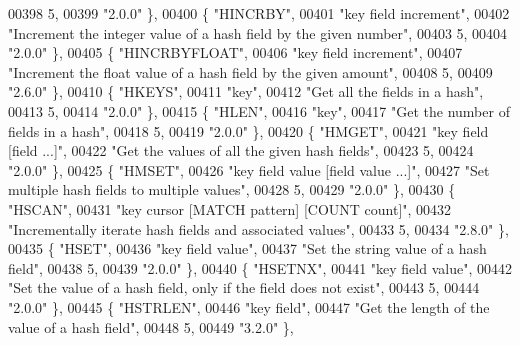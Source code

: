 \begin{DoxyCode}
00398     5,
00399     \textcolor{stringliteral}{"2.0.0"} \},
00400     \{ \textcolor{stringliteral}{"HINCRBY"},
00401     \textcolor{stringliteral}{"key field increment"},
00402     \textcolor{stringliteral}{"Increment the integer value of a hash field by the given number"},
00403     5,
00404     \textcolor{stringliteral}{"2.0.0"} \},
00405     \{ \textcolor{stringliteral}{"HINCRBYFLOAT"},
00406     \textcolor{stringliteral}{"key field increment"},
00407     \textcolor{stringliteral}{"Increment the float value of a hash field by the given amount"},
00408     5,
00409     \textcolor{stringliteral}{"2.6.0"} \},
00410     \{ \textcolor{stringliteral}{"HKEYS"},
00411     \textcolor{stringliteral}{"key"},
00412     \textcolor{stringliteral}{"Get all the fields in a hash"},
00413     5,
00414     \textcolor{stringliteral}{"2.0.0"} \},
00415     \{ \textcolor{stringliteral}{"HLEN"},
00416     \textcolor{stringliteral}{"key"},
00417     \textcolor{stringliteral}{"Get the number of fields in a hash"},
00418     5,
00419     \textcolor{stringliteral}{"2.0.0"} \},
00420     \{ \textcolor{stringliteral}{"HMGET"},
00421     \textcolor{stringliteral}{"key field [field ...]"},
00422     \textcolor{stringliteral}{"Get the values of all the given hash fields"},
00423     5,
00424     \textcolor{stringliteral}{"2.0.0"} \},
00425     \{ \textcolor{stringliteral}{"HMSET"},
00426     \textcolor{stringliteral}{"key field value [field value ...]"},
00427     \textcolor{stringliteral}{"Set multiple hash fields to multiple values"},
00428     5,
00429     \textcolor{stringliteral}{"2.0.0"} \},
00430     \{ \textcolor{stringliteral}{"HSCAN"},
00431     \textcolor{stringliteral}{"key cursor [MATCH pattern] [COUNT count]"},
00432     \textcolor{stringliteral}{"Incrementally iterate hash fields and associated values"},
00433     5,
00434     \textcolor{stringliteral}{"2.8.0"} \},
00435     \{ \textcolor{stringliteral}{"HSET"},
00436     \textcolor{stringliteral}{"key field value"},
00437     \textcolor{stringliteral}{"Set the string value of a hash field"},
00438     5,
00439     \textcolor{stringliteral}{"2.0.0"} \},
00440     \{ \textcolor{stringliteral}{"HSETNX"},
00441     \textcolor{stringliteral}{"key field value"},
00442     \textcolor{stringliteral}{"Set the value of a hash field, only if the field does not exist"},
00443     5,
00444     \textcolor{stringliteral}{"2.0.0"} \},
00445     \{ \textcolor{stringliteral}{"HSTRLEN"},
00446     \textcolor{stringliteral}{"key field"},
00447     \textcolor{stringliteral}{"Get the length of the value of a hash field"},
00448     5,
00449     \textcolor{stringliteral}{"3.2.0"} \},

\end{DoxyCode}
